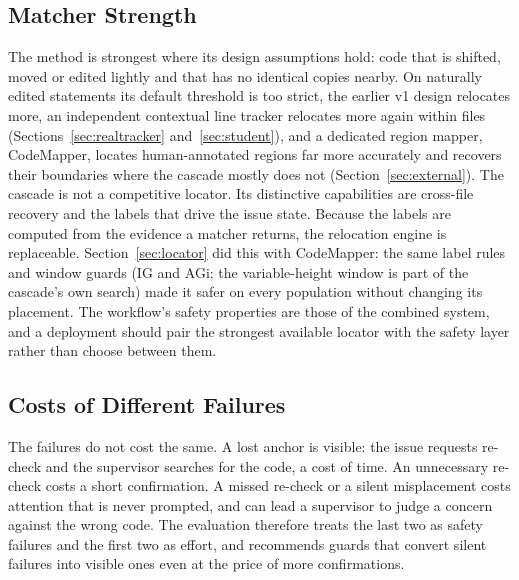 \subsection{Matcher Strength}
The method is strongest where its design assumptions hold: code that is shifted, moved or edited lightly and that has no identical copies nearby. On naturally edited statements its default threshold is too strict, the earlier v1 design relocates more, an independent contextual line tracker relocates more again within files (Sections~\ref{sec:realtracker} and~\ref{sec:student}), and a dedicated region mapper, CodeMapper, locates human-annotated regions far more accurately and recovers their boundaries where the cascade mostly does not (Section~\ref{sec:external}). The cascade is not a competitive locator. Its distinctive capabilities are cross-file recovery and the labels that drive the issue state. Because the labels are computed from the evidence a matcher returns, the relocation engine is replaceable. Section~\ref{sec:locator} did this with CodeMapper: the same label rules and window guards (IG and AGi; the variable-height window is part of the cascade's own search) made it safer on every population without changing its placement. The workflow's safety properties are those of the combined system, and a deployment should pair the strongest available locator with the safety layer rather than choose between them.

\subsection{Costs of Different Failures}
The failures do not cost the same. A lost anchor is visible: the issue requests re-check and the supervisor searches for the code, a cost of time. An unnecessary re-check costs a short confirmation. A missed re-check or a silent misplacement costs attention that is never prompted, and can lead a supervisor to judge a concern against the wrong code. The evaluation therefore treats the last two as safety failures and the first two as effort, and recommends guards that convert silent failures into visible ones even at the price of more confirmations.


